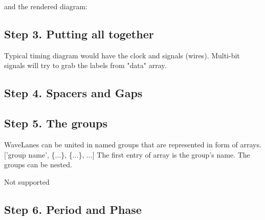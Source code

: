 \documentclass{article}
\begin{document}


and the rendered diagram: 

\begin{tikzpicture}[thick]
    
\end{tikzpicture}


\subsection{Step 3. Putting all together}

Typical timing diagram would have the clock and signals (wires). Multi-bit signals will try to grab the labels from "data" array. 



\begin{tikzpicture}[thick]
    
\end{tikzpicture}


\subsection{Step 4. Spacers and Gaps}



\begin{tikzpicture}[thick]
    
\end{tikzpicture}


\subsection{Step 5. The groups}
WaveLanes can be united in named groups that are represented in form of arrays. 
['group name', \{...\}, \{...\}, ...] The first entry of array is the group's name. The groups can be nested. 



%     

Not supported

\subsection{Step 6. Period and Phase}
\end{document}

